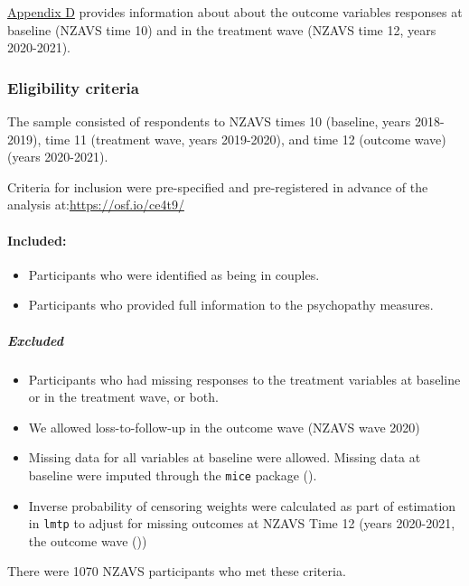 \documentclass[
  singlecolumn]{article}
\let\oldparagraph\paragraph
\renewcommand{\paragraph}[1]{\oldparagraph{#1}\mbox{}}
\let\oldsubparagraph\subparagraph
\renewcommand{\subparagraph}[1]{\oldsubparagraph{#1}\mbox{}}
\providecommand{\tightlist}{%
  \setlength{\itemsep}{0pt}\setlength{\parskip}{0pt}}\usepackage{longtable,booktabs,array}
\begin{document}
\hyperref[appendix-outcomes]{Appendix D} provides information about
about the outcome variables responses at baseline (NZAVS time 10) and in
the treatment wave (NZAVS time 12, years 2020-2021).

\subsubsection{Eligibility criteria}\label{eligibility-criteria}

The sample consisted of respondents to NZAVS times 10 (baseline, years
2018-2019), time 11 (treatment wave, years 2019-2020), and time 12
(outcome wave) (years 2020-2021).

Criteria for inclusion were pre-specified and pre-registered in advance
of the analysis at:\url{https://osf.io/ce4t9/}

\paragraph{Included:}\label{included}

\begin{itemize}
\tightlist
\item
  Participants who were identified as being in couples.\\
\item
  Participants who provided full information to the psychopathy
  measures.
\end{itemize}

\subparagraph{Excluded}\label{excluded}

\begin{itemize}
\tightlist
\item
  Participants who had missing responses to the treatment variables at
  baseline or in the treatment wave, or both.
\item
  We allowed loss-to-follow-up in the outcome wave (NZAVS wave 2020)
\item
  Missing data for all variables at baseline were allowed. Missing data
  at baseline were imputed through the \texttt{mice} package
  ().
\item
  Inverse probability of censoring weights were calculated as part of
  estimation in \texttt{lmtp} to adjust for missing outcomes at NZAVS
  Time 12 (years 2020-2021, the outcome wave
  ())
\end{itemize}

There were 1070 NZAVS participants who met these criteria.
\end{document}
